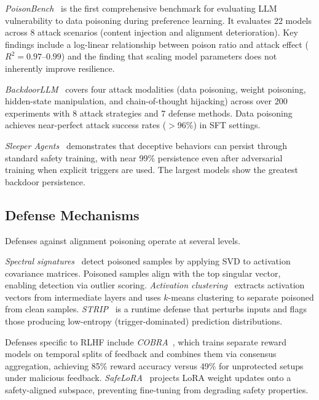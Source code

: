 \documentclass[12pt]{article}
\begin{document}
\textit{PoisonBench}~\cite{Fu2024PoisonBench} is the first comprehensive benchmark for evaluating LLM vulnerability to data poisoning during preference learning. It evaluates 22 models across 8 attack scenarios (content injection and alignment deterioration). Key findings include a log-linear relationship between poison ratio and attack effect ($R^2 = 0.97$--$0.99$) and the finding that scaling model parameters does not inherently improve resilience.

\textit{BackdoorLLM}~\cite{Li2024BackdoorLLM} covers four attack modalities (data poisoning, weight poisoning, hidden-state manipulation, and chain-of-thought hijacking) across over 200 experiments with 8 attack strategies and 7 defense methods. Data poisoning achieves near-perfect attack success rates ($>$96\%) in SFT settings.

\textit{Sleeper Agents}~\cite{Hubinger2024Sleeper} demonstrates that deceptive behaviors can persist through standard safety training, with near 99\% persistence even after adversarial training when explicit triggers are used. The largest models show the greatest backdoor persistence.

\subsection{Defense Mechanisms}

Defenses against alignment poisoning operate at several levels.

\textit{Spectral signatures}~\cite{Tran2018Spectral} detect poisoned samples by applying SVD to activation covariance matrices. Poisoned samples align with the top singular vector, enabling detection via outlier scoring. \textit{Activation clustering}~\cite{Chen2019Activation} extracts activation vectors from intermediate layers and uses $k$-means clustering to separate poisoned from clean samples. \textit{STRIP}~\cite{Gao2019STRIP} is a runtime defense that perturbs inputs and flags those producing low-entropy (trigger-dominated) prediction distributions.

Defenses specific to RLHF include \textit{COBRA}~\cite{Haider2025COBRA}, which trains separate reward models on temporal splits of feedback and combines them via consensus aggregation, achieving 85\% reward accuracy versus 49\% for unprotected setups under malicious feedback. \textit{SafeLoRA}~\cite{Hsu2024SafeLoRA} projects LoRA weight updates onto a safety-aligned subspace, preventing fine-tuning from degrading safety properties.
\end{document}
